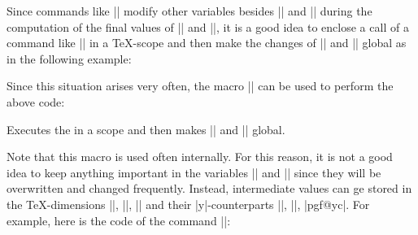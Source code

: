 Since commands like |\pgfpointnormalised| modify other variables besides
|\pgf@x| and |\pgf@y| during the computation of the final values of |\pgf@x|
and |\pgf@y|, it is a good idea to enclose a call of a command like |\pgfpoint|
in a \TeX-scope and then make the changes of |\pgf@x| and |\pgf@y| global as in
the following example:

\makeatletter
Since this situation arises very often, the macro |\pgf@process| can
be used to perform the above code:
\begin{command}{\pgf@process{}}
    Executes the  in a scope and then makes |\pgf@x| and |\pgf@y|
    global.
\end{command}

Note that this macro is used often internally. For this reason, it is not a
good idea to keep anything important in the variables |\pgf@x| and |\pgf@y|
since they will be overwritten and changed frequently. Instead, intermediate
values can ge stored in the \TeX-dimensions |\pgf@xa|, |\pgf@xb|, |\pgf@xc| and
their |y|-counterparts |\pgf@ya|, |\pgf@yb|, |pgf@yc|. For example, here is the
code of the command |\pgfpointadd|:
%
\begin{codeexample}
\def\pgfpointadd#1#2{%
  \pgf@process{#1}%
  \pgf@xa=\pgf@x%
  \pgf@ya=\pgf@y%
  \pgf@process{#2}%
  \advance\pgf@x by\pgf@xa%
  \advance\pgf@y by\pgf@ya}
\end{codeexample}


